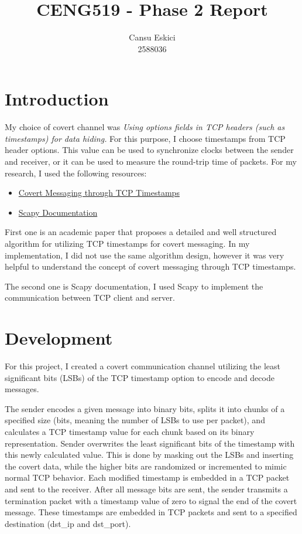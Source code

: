 \documentclass[10pt,a4paper]{article}
\title{CENG519 - Phase 2 Report}
\author{
  Cansu Eskici\\
  2588036}
\begin{document}
\maketitle
\section*{Introduction}
My choice of covert channel was \textit{Using options fields in TCP headers (such as timestamps) for data hiding.} 
For this purpose, I choose timestamps from TCP header options. 
This value can be used to synchronize clocks between the sender and receiver, or it can be used to measure the round-trip time of packets.
For my research, I used the following resources:
\begin{itemize}
    \item \href{https://web.mit.edu/greenie/Public/petspaper.pdf}{Covert Messaging through TCP Timestamps}
    \item \href{https://scapy.readthedocs.io/en/latest/}{Scapy Documentation}
\end{itemize}

First one is an academic paper that proposes a detailed and well structured algorithm for utilizing TCP timestamps for covert messaging. In my implementation, I did not use the same algorithm design, however it was very helpful to understand the concept of covert messaging through TCP timestamps.

The second one is Scapy documentation, I used Scapy to implement the communication between TCP client and server. 

\section*{Development}

For this project, I created a covert communication channel utilizing the least significant bits (LSBs) of the TCP timestamp option to encode and decode messages.


The sender encodes a given message into binary bits, splits it into chunks of a specified size (bits, meaning the number of LSBs to use per packet), and calculates a TCP timestamp value for each chunk based on its binary representation. 
Sender overwrites the least significant bits of the timestamp with this newly calculated value. 
This is done by masking out the LSBs and inserting the covert data, while the higher bits are randomized or incremented to mimic normal TCP behavior. 
Each modified timestamp is embedded in a TCP packet and sent to the receiver.
After all message bits are sent, the sender transmits a termination packet with a timestamp value of zero to signal the end of the covert message.
These timestamps are embedded in TCP packets and sent to a specified destination (dst\_ip and dst\_port). 
\end{document}
